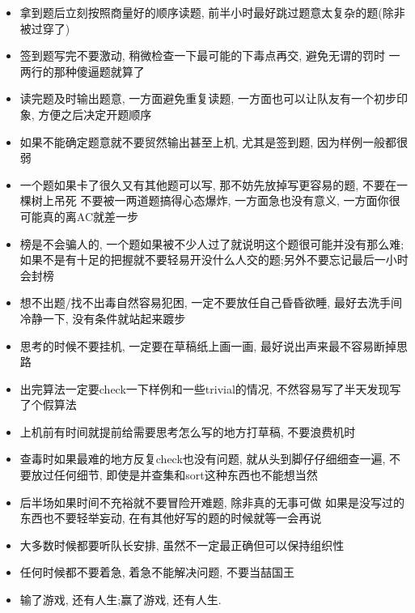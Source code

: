 \noindent
\begin{itemize}
	\item 拿到题后立刻按照商量好的顺序读题, 前半小时最好跳过题意太复杂的题(除非被过穿了)
	
	\item 签到题写完不要激动, 稍微检查一下最可能的下毒点再交, 避免无谓的罚时
		\subitem 一两行的那种傻逼题就算了
		
	\item 读完题及时输出题意, 一方面避免重复读题, 一方面也可以让队友有一个初步印象, 方便之后决定开题顺序
	
	\item 如果不能确定题意就不要贸然输出甚至上机,  尤其是签到题,  因为样例一般都很弱
	
	\item 一个题如果卡了很久又有其他题可以写, 那不妨先放掉写更容易的题, 不要在一棵树上吊死
		\subitem 不要被一两道题搞得心态爆炸, 一方面急也没有意义, 一方面你很可能真的离AC就差一步
		
	\item 榜是不会骗人的, 一个题如果被不少人过了就说明这个题很可能并没有那么难;如果不是有十足的把握就不要轻易开没什么人交的题;另外不要忘记最后一小时会封榜
	
	\item 想不出题/找不出毒自然容易犯困, 一定不要放任自己昏昏欲睡, 最好去洗手间冷静一下, 没有条件就站起来踱步
	
	\item 思考的时候不要挂机, 一定要在草稿纸上画一画, 最好说出声来最不容易断掉思路
	
	\item 出完算法一定要check一下样例和一些trivial的情况, 不然容易写了半天发现写了个假算法
	
	\item 上机前有时间就提前给需要思考怎么写的地方打草稿, 不要浪费机时
	
	\item 查毒时如果最难的地方反复check也没有问题, 就从头到脚仔仔细细查一遍, 不要放过任何细节, 即使是并查集和sort这种东西也不能想当然
	
	\item 后半场如果时间不充裕就不要冒险开难题, 除非真的无事可做
		\subitem 如果是没写过的东西也不要轻举妄动, 在有其他好写的题的时候就等一会再说
		
	\item 大多数时候都要听队长安排, 虽然不一定最正确但可以保持组织性
	
	
	\item 任何时候都不要着急, 着急不能解决问题, 不要当喆国王
	
	\item 输了游戏, 还有人生;赢了游戏, 还有人生.
\end{itemize}